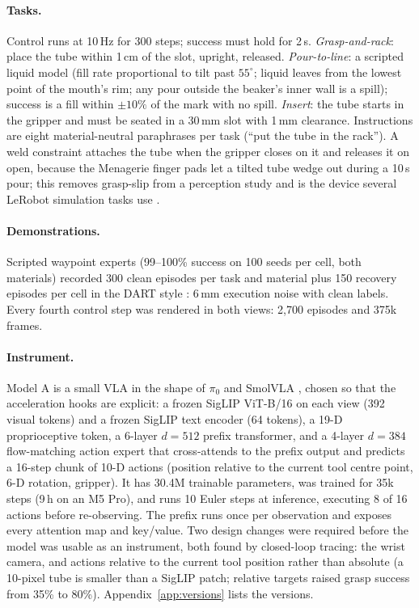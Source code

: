 \documentclass[11pt]{article}
\begin{document}
\paragraph{Tasks.} Control runs at 10\,Hz for 300 steps; success must hold for 2\,s. \emph{Grasp-and-rack}: place the tube within 1\,cm of the slot, upright, released. \emph{Pour-to-line}: a scripted liquid model (fill rate proportional to tilt past $55^\circ$; liquid leaves from the lowest point of the mouth's rim; any pour outside the beaker's inner wall is a spill); success is a fill within $\pm 10\%$ of the mark with no spill. \emph{Insert}: the tube starts in the gripper and must be seated in a 30\,mm slot with 1\,mm clearance. Instructions are eight material-neutral paraphrases per task (``put the tube in the rack''). A weld constraint attaches the tube when the gripper closes on it and releases it on open, because the Menagerie finger pads let a tilted tube wedge out during a 10\,s pour; this removes grasp-slip from a perception study and is the device several LeRobot simulation tasks use \citep{cadene2024lerobot}.

\paragraph{Demonstrations.} Scripted waypoint experts (99--100\% success on 100 seeds per cell, both materials) recorded 300 clean episodes per task and material plus 150 recovery episodes per cell in the DART style \citep{laskey2017dart}: 6\,mm execution noise with clean labels. Every fourth control step was rendered in both views: 2,700 episodes and 375k frames.

\paragraph{Instrument.} Model A is a small VLA in the shape of $\pi_0$ and SmolVLA \citep{black2025pi0,shukor2025smolvla}, chosen so that the acceleration hooks are explicit: a frozen SigLIP ViT-B/16 \citep{zhai2023siglip} on each view (392 visual tokens) and a frozen SigLIP text encoder (64 tokens), a 19-D proprioceptive token, a 6-layer $d{=}512$ prefix transformer, and a 4-layer $d{=}384$ flow-matching action expert that cross-attends to the prefix output and predicts a 16-step chunk of 10-D actions (position relative to the current tool centre point, 6-D rotation, gripper). It has 30.4M trainable parameters, was trained for 35k steps (9\,h on an M5 Pro), and runs 10 Euler steps at inference, executing 8 of 16 actions before re-observing. The prefix runs once per observation and exposes every attention map and key/value. Two design changes were required before the model was usable as an instrument, both found by closed-loop tracing: the wrist camera, and actions relative to the current tool position rather than absolute (a 10-pixel tube is smaller than a SigLIP patch; relative targets raised grasp success from 35\% to 80\%). Appendix~\ref{app:versions} lists the versions.
\end{document}
